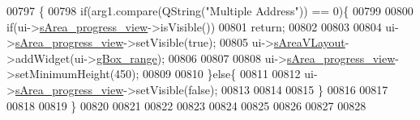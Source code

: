 \begin{DoxyCode}
00797 \{
00798     \textcolor{keywordflow}{if}(arg1.compare(QString(\textcolor{stringliteral}{"Multiple Address"})) == 0)\{
00799 
00800         \textcolor{keywordflow}{if}(ui->\hyperlink{a00027_ae4fe44aa026dd0e84e0f10cdcabca504}{sArea\_progress\_view}->isVisible())
00801               \textcolor{keywordflow}{return};
00802 
00803 
00804         ui->\hyperlink{a00027_ae4fe44aa026dd0e84e0f10cdcabca504}{sArea\_progress\_view}->setVisible(\textcolor{keyword}{true});
00805         ui->\hyperlink{a00027_a2bdce9ad313cd4ee575613f36cbc4678}{sAreaVLayout}->addWidget(ui->\hyperlink{a00027_a3c12d0504a310784c3820d1a9ad469c2}{gBox\_range});
00806 
00807 
00808         ui->\hyperlink{a00027_ae4fe44aa026dd0e84e0f10cdcabca504}{sArea\_progress\_view}->setMinimumHeight(450);
00809 
00810        \}\textcolor{keywordflow}{else}\{
00811 
00812         ui->\hyperlink{a00027_ae4fe44aa026dd0e84e0f10cdcabca504}{sArea\_progress\_view}->setVisible(\textcolor{keyword}{false});
00813 
00814 
00815        \}
00816 
00817 
00818 
00819 \}
00820 
00821 
00822 
00823 
00824 
00825 
00826 
00827 
00828 
\end{DoxyCode}
